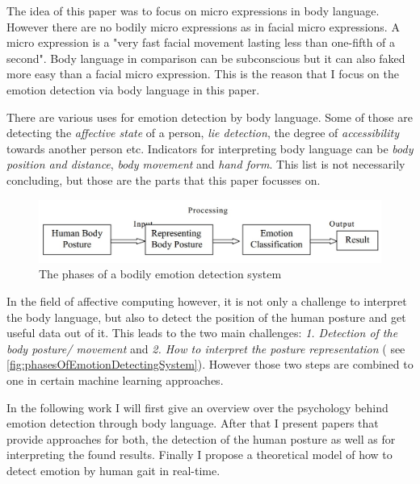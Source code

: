 \documentclass[conference]{IEEEtran}
\begin{document}
The idea of this paper was to focus on micro expressions in body language. However there are no bodily micro expressions as in facial micro expressions. A micro expression is a "very fast facial movement lasting less than one-fifth of a second"\cite{eckman2003emotions}. Body language in comparison can be subconscious but it can also faked more easy than a facial micro expression. This is the reason that I focus on the emotion detection via body language in this paper.

There are various uses for emotion detection by body language. Some of those are detecting the \emph{affective state} of a person, \emph{lie detection}, the degree of \emph{accessibility} towards another person etc. Indicators for interpreting body language can be \emph{body position and distance}\cite{mccoll2012affect,mehrabian1969significance}, \emph{body movement}\cite{singhsignificance,karg2012pattern} and \emph{hand form}\cite{wang2007hand,triesch2001system}. This list is not necessarily concluding, but those are the parts that this paper focusses on.

\begin{figure}[H]
\centering
   \includegraphics[width=\linewidth]{phasesOfEmotionDetectingSystem.jpg}
  \caption{The phases of a bodily emotion detection system\cite{singhsignificance}}
  \label{fig:phasesOfEmotionDetectingSystem}
\end{figure}


In the field of affective computing however, it is not only a challenge to interpret the body language, but also to detect the position of the human posture and get useful data out of it. This leads to the two main challenges: \emph{1. Detection of the body posture/ movement} and \emph{2. How to interpret the posture representation} ( see \autoref{fig:phasesOfEmotionDetectingSystem}\cite{singhsignificance}). However those two steps are combined to one in certain machine learning approaches\cite{schindler2008recognizing, kleinsmith2007recognizing, kleinsmith2005incremental}.

In the following work I will first give an overview over the psychology behind emotion detection through body language. After that I present papers that provide approaches for both, the detection of the human posture as well as for interpreting the found results. Finally I propose a theoretical model of how to detect emotion by human gait in real-time. 
\end{document}
